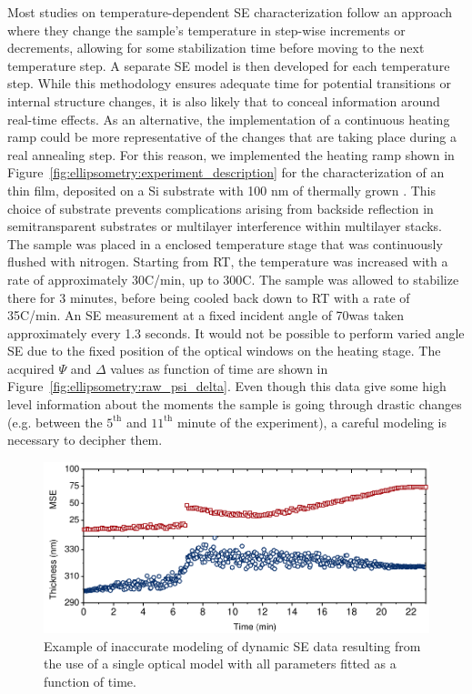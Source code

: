 Most studies on temperature-dependent SE characterization follow an approach where they change the sample's temperature in step-wise increments or decrements, allowing for some stabilization time before moving to the next temperature step. A separate SE model is then developed for each temperature step. While this methodology ensures adequate time for potential transitions or internal structure changes, it is also likely that to conceal information around real-time effects. As an alternative, the implementation of a continuous heating ramp could be more representative of the changes that are taking place during a real annealing step. For this reason, we implemented the heating ramp shown in Figure~\ref{fig:ellipsometry:experiment_description} for the characterization of an   thin film, deposited on a Si substrate with 100 nm of thermally grown . This choice of substrate prevents complications arising from backside reflection in semitransparent substrates or multilayer interference within multilayer stacks. The sample was placed in a enclosed temperature stage that was continuously flushed with nitrogen. Starting from RT, the temperature was increased with a rate of approximately 30\degree C/min, up to 300\degree C. The sample was allowed to stabilize there for 3 minutes, before being cooled back down to RT with a rate of 35\degree C/min. An SE measurement at a fixed incident angle of 70\degree was taken approximately every 1.3 seconds. It would not be possible to perform varied angle SE due to the fixed position of the optical windows on the heating stage. The acquired $\Psi$ and $\Delta$ values
as function of time are shown in Figure~\ref{fig:ellipsometry:raw_psi_delta}. Even though this data give some high level information about the moments the sample is going through drastic changes (e.g. between the $5^{\text{th}}$ and $11^{\text{th}}$ minute of the experiment), a careful modeling is necessary to decipher them. 

\begin{figure}
  \centering
  \medskip
  \includegraphics[width=.77\textwidth]{chapters/ellipsometry/image/wrong_model.pdf}
  \caption[Example of inaccurate modeling of dynamic SE data resulting from the use of a single optical model with all parameters fitted as a function of time.]{Example of inaccurate modeling of dynamic SE data resulting from the use of a single optical model with all parameters fitted as a function of time.}
  \label{fig:ellipsometry:wrong_model}
\end{figure}


